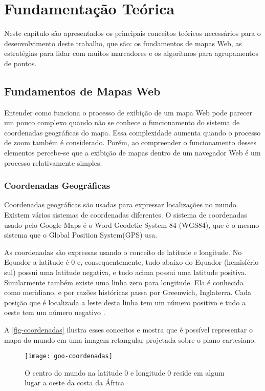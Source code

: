 \chapter{Fundamentação Teórica}

Neste capítulo são apresentados os principais conceitos teóricos necessários para o desenvolvimento deste trabalho, que são: os fundamentos de mapas Web, as estratégias para lidar com muitos marcadores e os algoritmos para agrupamentos de pontos.

\section{Fundamentos de Mapas Web}
	Entender como funciona o processo de exibição de um mapa Web pode parecer um pouco complexo quando não se conhece o funcionamento do sistema de coordenadas geográficas do mapa. Essa complexidade aumenta quando o processo de zoom também é considerado. Porém, ao compreender o funcionamento desses elementos percebe-se que a exibição de mapas dentro de um navegador Web é um processo relativamente simples.
	
	\subsection{Coordenadas Geográficas}
	Coordenadas geográficas são usadas para expressar localizações no mundo. Existem vários sistemas de coordenadas diferentes. O sistema de coordenadas usado pelo Google Maps é o Word Geodetic System 84 (WGS84), que é o mesmo sistema que o Global Position System(GPS) usa.
	
	As coordenadas são expressas usando o conceito de latitude e longitude. No Equador a latitude é 0 e, consequentemente, tudo abaixo do Equador (hemisfério sul) possui uma latitude negativa, e tudo acima possui uma latitude positiva. Similarmente também existe uma linha zero para longitude. Ela é conhecida como meridiano, e por razões históricas passa por Greenwich, Inglaterra. Cada posição que é localizada a leste desta linha tem um número positivo e tudo a oeste tem um número negativo  \cite[p. 4]{livroGoogleApiV3}. 
	
	A \autoref{fig-coordenadas} ilustra esses conceitos e mostra que é possível representar o mapa do mundo em uma imagem retangular projetada sobre o plano cartesiano.
	
	\begin{figure}[htb]
	\caption{\label{fig-coordenadas} O centro do mundo na latitude 0 e longitude 0 reside em algum lugar a oeste da costa da África}
	\begin{center}
	    \texttt{[image: goo-coordenadas]}
	\end{center}
	\end{figure}
	
